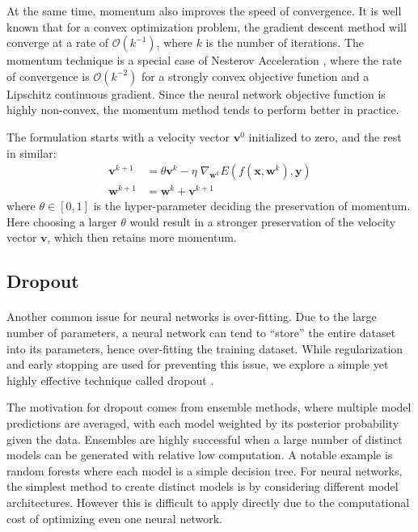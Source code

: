 At the same time, 
momentum also improves the speed of convergence.
It is well known that for a convex optimization problem,
the gradient descent method will converge at a rate 
of $\mathcal{O}(k^{-1})$, 
where $k$ is the number of iterations.
The momentum technique is a special case of 
Nesterov Acceleration \cite{Ne13},
where the rate of convergence is 
$\mathcal{O}(k^{-2})$ for a strongly convex 
objective function and a Lipschitz continuous gradient.
Since the neural network objective function is highly
non-convex, the momentum method tends to 
perform better in practice.

The formulation starts with a velocity vector $\mathbf{v}^0$
initialized to zero, and the rest in similar:
%
\begin{equation*}
\begin{aligned}
	\mathbf{v}^{k+1} &= \theta \mathbf{v}^{k} - \eta \; \nabla_{\mathbf{w}^k} 
				E\left(f(\mathbf{x},\mathbf{w}^k),\mathbf{y}\right) \\
	\mathbf{w}^{k+1} &= \mathbf{w}^{k} + \mathbf{v}^{k+1}
\end{aligned}
\end{equation*}
%
where $\theta \in [0,1]$ is the hyper-parameter 
deciding the preservation of momentum.
Here choosing a larger $\theta$ would result in a stronger 
preservation of the velocity vector $\mathbf{v}$,
which then retains more momentum.






\subsection{Dropout} \label{subsc:dropout}

\paragraph{}
Another common issue for neural networks is over-fitting.
Due to the large number of parameters, 
a neural network can tend to ``store'' the entire dataset 
into its parameters, 
hence over-fitting the training dataset.
While regularization and early stopping are used for 
preventing this issue,
we explore a simple yet highly effective 
technique called dropout \cite{SrHi14}.

The motivation for dropout comes from ensemble methods,
where multiple model predictions are averaged,
with each model weighted by its posterior probability 
given the data.
Ensembles are highly successful when
a large number of distinct models can be generated with 
relative low computation.
A notable example is random forests \cite{Br01}
where each model is a simple decision tree.
For neural networks, 
the simplest method to create distinct models 
is by considering different model architectures.
However this is difficult to apply directly
due to the computational cost of optimizing even 
one neural network.

